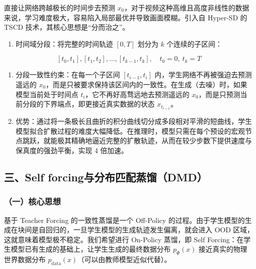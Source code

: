 直接让网络跨越极长的时间步去预测 \(x_0\)，对于视频这种高维且高度非线性的数据来说，学习难度极大，容易陷入局部最优并导致画面模糊。引入自 Hyper-SD 的 TSCD 技术，其核心思想是``分而治之''。

\begin{enumerate}
\def\labelenumi{\arabic{enumi}.}
\tightlist
\item
  时间域分段：将完整的时间轨迹 \([0,T]\) 划分为 \(k\) 个连续的子区间：
\end{enumerate}

\[
[t_0,t_1],[t_1,t_2],\ldots,[t_{k-1},t_k],\quad t_0=0,\ t_k=T
\]

\begin{enumerate}
\def\labelenumi{\arabic{enumi}.}
\setcounter{enumi}{1}
\item
  分段一致性约束：在每一个子区间 \([t_{i-1},t_i]\) 内，学生网络不再被强迫去预测遥远的 \(x_0\)，而是只被要求保持该区间内的一致性。在生成（去噪）时，如果模型当前处于时间点 \(t_i\)，它不再好高骛远地去预测遥远的 \(x_0\)，而是只预测当前分段的下界端点，即更接近真实数据的状态 \(x_{t_{i-1}}\)。
\item
  优势：通过将一条极长且曲折的积分曲线切分成多段相对平滑的短曲线，学生模型拟合扩散过程的难度大幅降低。在推理时，模型只需在每个预设的宏观节点跳跃，就能极其精确地逼近完整的扩散轨迹，从而在较少步数下提供速度与保真度的强劲平衡，实现 4 倍加速。
\end{enumerate}

\hypertarget{ux4e09self-forcingux4e0eux5206ux5e03ux5339ux914dux84b8ux998fdmd}{%
\subsection{三、Self forcing与分布匹配蒸馏（DMD）}\label{ux4e09self-forcingux4e0eux5206ux5e03ux5339ux914dux84b8ux998fdmd}}

\hypertarget{ux4e00ux6838ux5fc3ux601dux60f3-12}{%
\subsubsection{（一）核心思想}\label{ux4e00ux6838ux5fc3ux601dux60f3-12}}

基于 Teacher Forcing 的一致性蒸馏是一个 Off-Policy 的过程。由于学生模型的生成在块间是自回归的，一旦学生模型的生成轨迹发生偏离，就会进入 OOD 区域，这就意味着模型极不稳定。我们希望进行 On-Policy 蒸馏，即 Self Forcing：在学生模型已有生成的基础上，让学生生成的最终数据分布 \(p_\Phi(x)\) 接近真实的物理世界数据分布 \(p_{\mathrm{data}}(x)\)（可以由教师模型近似代替）。

